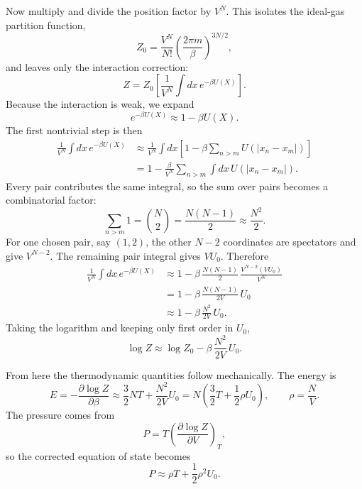 Now multiply and divide the position factor by \(V^N\). This isolates the ideal-gas partition function,
\begin{equation}
Z_0=\frac{V^N}{N!}\left(\frac{2\pi m}{\beta}\right)^{3N/2},
\end{equation}
and leaves only the interaction correction:
\begin{equation}
Z=Z_0\left[\frac{1}{V^N}\int dx\,e^{-\beta U(X)}\right].
\end{equation}
Because the interaction is weak, we expand
\begin{equation}
e^{-\beta U(X)}\approx 1-\beta U(X).
\end{equation}
The first nontrivial step is then
\begin{align}
\frac{1}{V^N}\int dx\,e^{-\beta U(X)}
&\approx \frac{1}{V^N}\int dx\left[1-\beta\sum_{n>m}U\!\left(|x_n-x_m|\right)\right] \\
&=1-\frac{\beta}{V^N}\sum_{n>m}\int dx\,U\!\left(|x_n-x_m|\right).
\end{align}
Every pair contributes the same integral, so the sum over pairs becomes a combinatorial factor:
\begin{equation}
\sum_{n>m}1=\binom{N}{2}=\frac{N(N-1)}{2}\approx \frac{N^2}{2}.
\end{equation}
For one chosen pair, say \((1,2)\), the other \(N-2\) coordinates are spectators and give \(V^{N-2}\). The remaining pair integral gives \(V U_0\). Therefore
\begin{align}
\frac{1}{V^N}\int dx\,e^{-\beta U(X)}
&\approx 1-\beta\,\frac{N(N-1)}{2}\,\frac{V^{N-2}(V U_0)}{V^N} \\
&=1-\beta\,\frac{N(N-1)}{2V}\,U_0 \\
&\approx 1-\beta\,\frac{N^2}{2V}\,U_0.
\end{align}
Taking the logarithm and keeping only first order in \(U_0\),
\begin{equation}
\log Z\approx \log Z_0-\beta\,\frac{N^2}{2V}\,U_0.
\end{equation}

From here the thermodynamic quantities follow mechanically. The energy is
\begin{equation}
E=-\frac{\partial \log Z}{\partial \beta}
\approx \frac{3}{2}NT+\frac{N^2}{2V}U_0
= N\left(\frac{3}{2}T+\frac{1}{2}\rho U_0\right),
\qquad \rho=\frac{N}{V}.
\end{equation}
The pressure comes from
\begin{equation}
P=T\left(\frac{\partial \log Z}{\partial V}\right)_T,
\end{equation}
so the corrected equation of state becomes
\begin{equation}
P\approx \rho T+\frac{1}{2}\rho^2U_0.
\end{equation}


